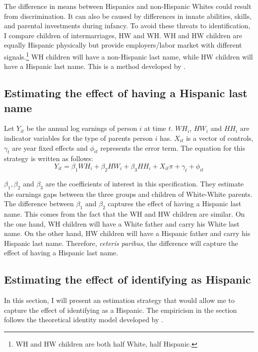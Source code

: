 \documentclass[12pt, fullpage]{article}
\begin{document}
The difference in means between Hispanics and non-Hispanic Whites could result from discrimination. It can also be caused by differences in innate abilities, skills, and parental investments during infancy. To avoid these threats to identification, I compare children of intermarriages, HW and WH. WH and HW children are equally Hispanic physically but provide employers/labor market with different signals.\footnote{WH and HW children are both half White, half Hispanic.} WH children will have a non-Hispanic last name, while HW children will have a Hispanic last name. This is a method developed by \citet{rubinstein2014pride}.

\subsection{Estimating the effect of having a Hispanic last name}

Let $Y_{it}$ be the annual log earnings of person $i$ at time $t$. $WH_{i}$, $HW_{i}$ and $HH_{i}$ are indicator variables for the type of parents person $i$ has. $X_{it}$ is a vector of controls, $\gamma_{t}$ are year fixed effects and $\phi_{it}$ represents the error term. The equation for this strategy is written as follows:
\begin{equation} \label{eq:1a}
Y_{it} = \beta_{1} WH_{i} +\beta_{2} HW_{i} + \beta_{3} HH_{i} + X_{it} \pi + \gamma_{t}+\phi_{it}
\end{equation}

$\beta_{1}, \beta_{2}$ and $\beta_{3}$ are the coefficients of interest in this specification. They estimate the earnings gaps between the three groups and children of White-White parents. The difference between $\beta_{1}$ and $\beta_{2}$ captures the effect of having a Hispanic last name. This comes from the fact that the WH and HW children are similar. On the one hand, WH children will have a White father and carry his White last name. On the other hand, HW children will have a Hispanic father and carry his Hispanic last name. Therefore, \textit{ceteris paribus}, the difference will capture the effect of having a Hispanic last name.

\subsection{Estimating the effect of identifying as Hispanic}

In this section, I will present an estimation strategy that would allow me to capture the effect of identifying as a Hispanic. The empiricism in the section follows the theoretical identity model developed by \citet{akerlof2000economics}. 
\end{document}
